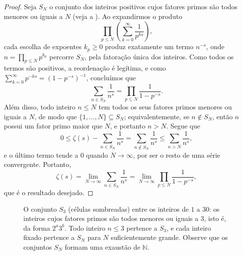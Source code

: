 \documentclass[12pt,portuguese]{article}
\let\leq\leqslant
\let\geq\geqslant
\theoremstyle{definition}
\begin{document}
\begin{proof}
Seja \(S_N\) o conjunto dos inteiros positivos cujos fatores primos são
todos menores ou iguais a \(N\) (veja a ). Ao
expandirmos o produto
\[
\prod_{p \leq N} \left(\sum_{k=0}^{\infty} \frac{1}{p^{ks}}\right),
\]
cada escolha de expoentes \(k_p \geq 0\) produz exatamente um termo
\(n^{-s}\), onde \(n = \prod_{p \leq N} p^{k_p}\) percorre \(S_N\), pela
fatoração única dos inteiros. Como todos os termos são positivos, a
reordenação é legítima, e como
\(\sum_{k=0}^{\infty} p^{-ks} = (1 - p^{-s})^{-1}\), concluímos que
\[
\sum_{n \in S_N} \frac{1}{n^s}
= \prod_{p \leq N} \frac{1}{1 - p^{-s}}.
\]
Além disso, todo inteiro \(n \leq N\) tem todos os seus fatores primos
menores ou iguais a \(N\), de modo que \(\{1, \dots, N\} \subseteq S_N\);
equivalentemente, se \(n \notin S_N\), então \(n\) possui um fator primo
maior que \(N\), e portanto \(n > N\). Segue que
\[
0 \leq \zeta(s) - \sum_{n \in S_N} \frac{1}{n^s}
= \sum_{n \notin S_N} \frac{1}{n^s}
\leq \sum_{n > N} \frac{1}{n^s},
\]
e o último termo tende a \(0\) quando \(N \to \infty\), por ser o resto
de uma série convergente. Portanto,
\[
\zeta(s) = \lim_{N \to \infty} \sum_{n \in S_N} \frac{1}{n^s}
= \lim_{N \to \infty} \prod_{p \leq N} \frac{1}{1 - p^{-s}},
\]
que é o resultado desejado.
\end{proof}

\begin{figure}[htbp]
\centering
{}
\caption{O conjunto \(S_3\) (células sombreadas) entre os inteiros de
\(1\) a \(30\): os inteiros cujos fatores primos são todos menores ou
iguais a \(3\), isto é, da forma \(2^a 3^b\). Todo inteiro
\(n \leq 3\) pertence a \(S_3\), e cada inteiro fixado pertence a
\(S_N\) para \(N\) suficientemente grande. Observe que  os conjuntos \(S_N\)
formam uma exaustão de \(\mathbb{N}\).}\label{fig:crivo-euler}
\end{figure}
\end{document}

